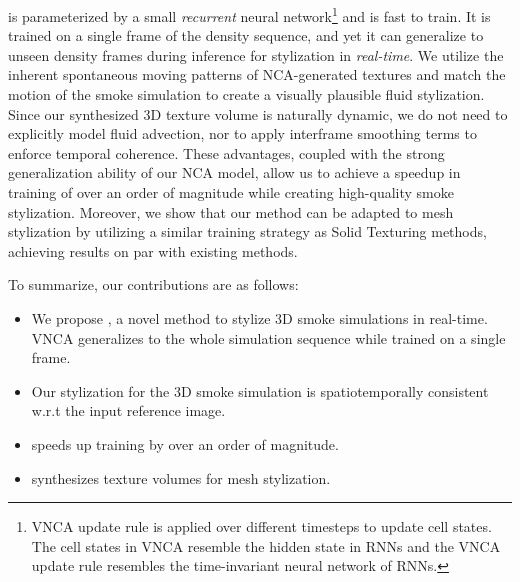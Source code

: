 \MethodName{} is parameterized by a small \textit{recurrent} neural network\footnote{VNCA update rule is applied over different timesteps to update cell states. The cell states in VNCA resemble the hidden state in RNNs and the VNCA update rule resembles the time-invariant neural network of RNNs. } and is fast to train.  
It is trained on a single frame of the density sequence, and yet it can generalize to unseen density frames during inference for stylization in \textit{real-time}. 
We utilize the inherent spontaneous moving patterns of NCA-generated textures and match the motion of the smoke simulation to create a visually plausible fluid stylization. 
Since our synthesized 3D texture volume is naturally dynamic, we do not need to explicitly model fluid advection, nor to apply interframe smoothing terms to enforce temporal coherence. 
These advantages, coupled with the strong generalization ability of our NCA model, allow us to achieve a speedup in training of over an order of magnitude while creating high-quality smoke stylization.
Moreover, we show that our method can be adapted to mesh stylization by utilizing a similar training strategy as Solid Texturing methods, achieving results on par with existing methods.   


 

\noindent To summarize, our contributions are as follows:
\begin{itemize}[leftmargin=*]
    \item We propose \MethodName{}, a novel method to stylize 3D smoke simulations in real-time. VNCA generalizes to the whole simulation sequence while trained on a single frame. 
    \item Our stylization for the 3D smoke simulation is spatiotemporally consistent w.r.t the input reference image. 
    \item \MethodName{} speeds up training by over an order of magnitude. 
    \item \MethodName{} synthesizes texture volumes for mesh stylization. 
\end{itemize}